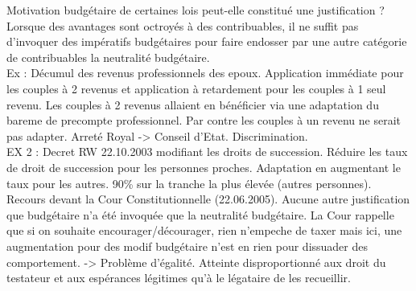 \documentclass{book}
\begin{document}
Motivation budgétaire de certaines lois peut-elle constitué une justification ? Lorsque des avantages sont octroyés à des contribuables, il ne suffit pas d'invoquer des impératifs budgétaires pour faire endosser par une autre catégorie de contribuables la neutralité budgétaire.\\

Ex : Décumul des revenus professionnels des epoux. Application immédiate pour les couples à 2 revenus et application à retardement pour les couples à 1 seul revenu. Les couples à 2 revenus allaient en bénéficier via une adaptation du bareme de precompte professionnel. Par contre les couples à un revenu ne serait pas adapter. Arreté Royal -> Conseil d'Etat. Discrimination.\\

EX 2 : Decret RW 22.10.2003 modifiant les droits de succession. Réduire les taux de droit de succession pour les personnes proches. Adaptation en augmentant le taux pour les autres. 90\% sur la tranche la plus élevée (autres personnes). Recours devant la Cour Constitutionnelle (22.06.2005). Aucune autre justification que budgétaire n'a  été invoquée que la neutralité budgétaire. La Cour rappelle que si on souhaite encourager/décourager, rien n'empeche de taxer mais ici, une augmentation pour des modif budgétaire n'est en rien pour dissuader des comportement. -> Problème d'égalité. Atteinte disproportionné aux droit du testateur et aux espérances légitimes qu'à le légataire de les recueillir.\\

















   
\nocite{*}

\end{document}
